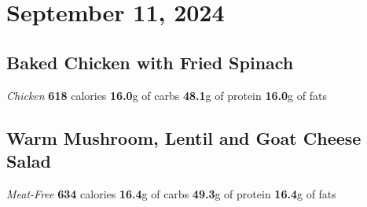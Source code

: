 \documentclass{article}%
\begin{document}
\section*{September 11, 2024}%
\label{sec:September11,2024}%
\begin{paracol}[2]{2}%
\sloppy%
\subsection*{Baked Chicken with Fried Spinach}%
\label{subsec:BakedChickenwithFriedSpinach}%
\textit{Chicken}%
\newline%
\newline%
\textbf{618} calories%
\newline%
\textbf{16.0}g of carbs%
\newline%
\textbf{48.1}g of protein%
\newline%
\textbf{16.0}g of fats%
\newline%
\switchcolumn

%
\subsection*{Warm Mushroom, Lentil and Goat Cheese Salad}%
\label{subsec:WarmMushroom,LentilandGoatCheeseSalad}%
\textit{Meat{-}Free}%
\newline%
\newline%
\textbf{634} calories%
\newline%
\textbf{16.4}g of carbs%
\newline%
\textbf{49.3}g of protein%
\newline%
\textbf{16.4}g of fats%
\newline%
\switchcolumn

%
\end{paracol}

%
\end{document}

